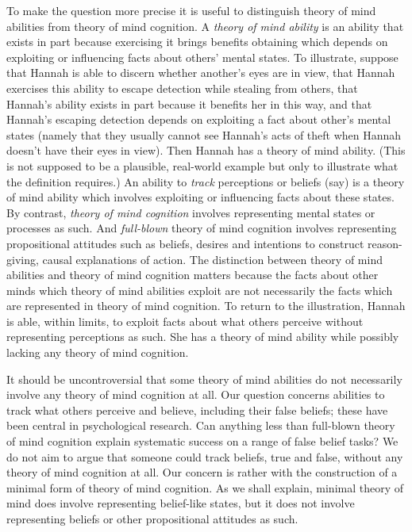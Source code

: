 \documentclass[12pt,\papersize]{extarticle}
\begin{document}
To make the question more precise it is useful to distinguish 
theory of mind abilities from theory of mind cognition.  
A  \textit{theory of mind ability} 
	\label{df:tom_ability}
is an ability that exists in part because exercising it brings benefits obtaining which depends on exploiting or influencing facts about others’ mental states.
To illustrate,
suppose that Hannah is able to discern whether another's eyes are in view,
that Hannah exercises this ability to escape detection while stealing from others,
that Hannah's ability exists in part because it benefits her in this way,
and 
that Hannah's escaping detection depends on exploiting a fact about other's mental states (namely that they usually cannot  see Hannah's acts of theft when Hannah doesn't have their eyes in view).
Then Hannah has a theory of mind ability.
(This is not supposed to be a plausible, real-world example but only to illustrate what the definition requires.)
An ability to \textit{track} 
	\label{df:track} 
perceptions or beliefs (say) is a theory of mind ability which involves exploiting or influencing facts about these states.
By contrast, \textit{theory of mind cognition} 
	\label{df:tom_cognition}
involves representing mental states or processes as such.
And \textit{full-blown} theory of mind cognition involves  representing propositional attitudes such as beliefs, desires and intentions to construct reason-giving, causal explanations of action.  
The distinction between theory of mind abilities and theory of mind cognition matters because the facts about other minds which theory of mind abilities exploit are not necessarily the facts which are represented in theory of mind cognition.  
To return to the illustration, Hannah is able, within limits, to exploit facts about what others perceive without representing perceptions as such. 
She has a theory of mind ability while possibly lacking any theory of mind cognition.

It should be uncontroversial that some theory of mind abilities do not necessarily involve any theory of mind cognition at all. 
Our question concerns abilities to track what others perceive and believe, including their false beliefs; these have been central in psychological research.
Can anything less than full-blown theory of mind cognition  explain systematic success on a range of false belief tasks?
We do not aim to argue that someone could track beliefs, true and false, without any theory of mind cognition at all.
Our concern is rather with the construction of a minimal form of theory of mind cognition.
As we shall explain, minimal theory of mind does involve representing  belief-like  states, but it does not involve representing beliefs or other propositional attitudes as such.
\end{document}
